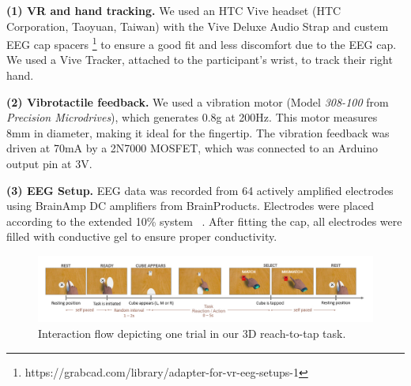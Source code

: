\textbf{(1) VR and hand tracking.} We used an HTC Vive headset (HTC Corporation, Taoyuan, Taiwan) with the Vive Deluxe Audio Strap and custem EEG cap spacers \footnote{https://grabcad.com/library/adapter-for-vr-eeg-setups-1} to ensure a good fit and less discomfort due to the EEG cap. We used a Vive Tracker, attached to the participant's wrist, to track their right hand. 

\textbf{(2) Vibrotactile feedback.} We used a vibration motor (Model \textit{308-100} from \textit{Precision Microdrives}), which generates 0.8g at 200Hz. This motor measures 8mm in diameter, making it ideal for the fingertip. The vibration feedback was driven at 70mA by a 2N7000 MOSFET, which was connected to an Arduino output pin at 3V.


\textbf{(3) EEG Setup.} EEG data was recorded from 64 actively amplified electrodes using BrainAmp DC amplifiers from BrainProducts. Electrodes were placed according to the extended 10\% system ~\cite{Chatrian1985-ys}. After fitting the cap, all electrodes were filled with conductive gel to ensure proper conductivity.

\begin{figure}[!ht]
\includegraphics[width=\linewidth]{figures/Task_mismatch.jpg}
\vspace{-15pt}
\caption{Interaction flow depicting one trial in our 3D reach-to-tap task.}
\label{task_flow}
\end{figure}

